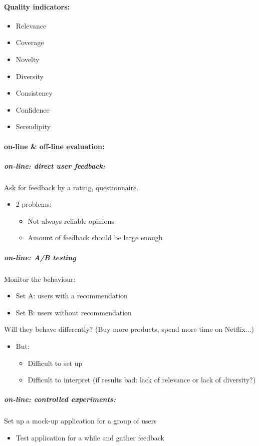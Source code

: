\documentclass[12pt]{article}
\begin{document}
\paragraph{Quality indicators:}
\begin{itemize}
    \item Relevance 
    \item Coverage 
    \item Novelty 
    \item Diversity 
    \item Consistency 
    \item Confidence 
    \item Serendipity
\end{itemize}
\paragraph{on-line \& off-line evaluation:}
\subparagraph{on-line: direct user feedback:}
Ask for feedback by a rating, questionnaire.
\begin{itemize}
    \item 2 problems:\begin{itemize}
        \item Not always reliable opinions 
        \item Amount of feedback should be large enough
    \end{itemize}
\end{itemize}
\subparagraph{on-line: A/B testing}
Monitor the behaviour:\begin{itemize}
    \item Set A: users with a recommendation
    \item Set B: users without recommendation
\end{itemize}
Will they behave differently? (Buy more products, spend more time on Netflix...)
\begin{itemize}
    \item But:\begin{itemize}
        \item Difficult to set up
        \item Difficult to interpret (if results bad: lack of relevance or lack of diversity?)
    \end{itemize}
\end{itemize}
\subparagraph{on-line: controlled experiments:}
Set up a mock-up application for a group of users\begin{itemize}
    \item Test application for a while and gather feedback
\end{itemize}
\end{document}
